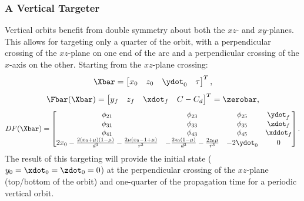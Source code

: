 \subsubsection{A Vertical Targeter}
Vertical orbits benefit from double symmetry about both the $xz$- and $xy$-planes. This allows for
targeting only a quarter of the orbit, with a perpendicular crossing of the $xz$-plane on one end
of the arc and a perpendicular crossing of the $x$-axis on the other. Starting from the $xz$-plane
crossing:
\begin{equation}
    \Xbar=\begin{bmatrix}   x_{0}   &   z_{0}   &   \ydot_{0}   &   \tau    \end{bmatrix}^{T},
    \label{eq:verticalfreevar}
\end{equation}
\begin{equation}
    \Fbar(\Xbar)=\begin{bmatrix}    y_{f}   &   z_{f}   &   \xdot_{f}   &   C-C_{d} \end{bmatrix}^{T}=\zerobar,
    \label{eq:verticalconst}
\end{equation}
\begin{equation}
    DF(\Xbar)=\begin{bmatrix}   \phi_{21}                                                                   &   \phi_{23}                                               &   \phi_{25}   &   \ydot_{f}   \\
                                \phi_{31}                                                                   &   \phi_{33}                                               &   \phi_{35}   &   \zdot_{f}   \\
                                \phi_{41}                                                                   &   \phi_{43}                                               &   \phi_{45}   &   \xddot_{f}  \\
                                2x_{0}-\frac{2(x_{0}+\mu)(1-\mu)}{d^{3}}-\frac{2\mu(x_{0}-1+\mu)}{r^{3}}    &   -\frac{2z_{0}(1-\mu)}{d^{3}}-\frac{2z_{0}\mu}{r^{3}}    &   -2\ydot_{0} &   0           \end{bmatrix}.
    \label{eq:verticaljacobian}
\end{equation}
The result of this targeting will provide the initial state ($y_{0}=\xdot_{0}=\zdot_{0}=0$) at the
perpendicular crossing of the $xz$-plane (top/bottom of the orbit) and one-quarter of the
propagation time for a periodic vertical orbit.

